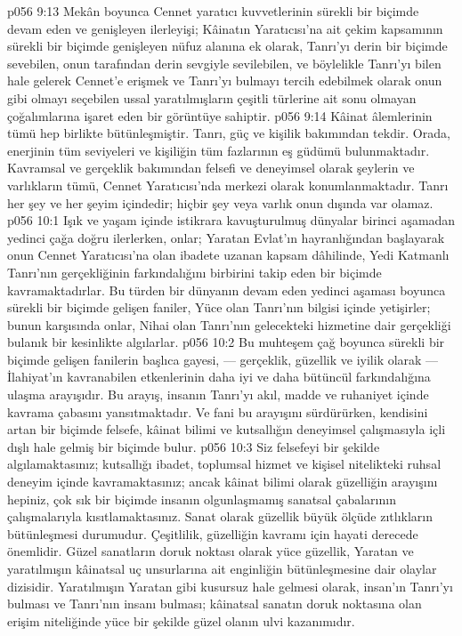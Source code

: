 \vs p056 9:13 Mekân boyunca Cennet yaratıcı kuvvetlerinin sürekli bir biçimde devam eden ve genişleyen ilerleyişi; Kâinatın Yaratıcısı’na ait çekim kapsamının sürekli bir biçimde genişleyen nüfuz alanına ek olarak, Tanrı’yı derin bir biçimde sevebilen, onun tarafından derin sevgiyle sevilebilen, ve böylelikle Tanrı’yı bilen hale gelerek Cennet’e erişmek ve Tanrı’yı bulmayı tercih edebilmek olarak onun gibi olmayı seçebilen ussal yaratılmışların çeşitli türlerine ait sonu olmayan çoğalımlarına işaret eden bir görüntüye sahiptir.
\vs p056 9:14 Kâinat âlemlerinin tümü hep birlikte bütünleşmiştir. Tanrı, güç ve kişilik bakımından tekdir. Orada, enerjinin tüm seviyeleri ve kişiliğin tüm fazlarının eş güdümü bulunmaktadır. Kavramsal ve gerçeklik bakımından felsefi ve deneyimsel olarak şeylerin ve varlıkların tümü, Cennet Yaratıcısı’nda merkezi olarak konumlanmaktadır. Tanrı her şey ve her şeyim içindedir; hiçbir şey veya varlık onun dışında var olamaz.
\vs p056 10:1 Işık ve yaşam içinde istikrara kavuşturulmuş dünyalar birinci aşamadan yedinci çağa doğru ilerlerken, onlar; Yaratan Evlat’ın hayranlığından başlayarak onun Cennet Yaratıcısı’na olan ibadete uzanan kapsam dâhilinde, Yedi Katmanlı Tanrı’nın gerçekliğinin farkındalığını birbirini takip eden bir biçimde kavramaktadırlar. Bu türden bir dünyanın devam eden yedinci aşaması boyunca sürekli bir biçimde gelişen faniler, Yüce olan Tanrı’nın bilgisi içinde yetişirler; bunun karşısında onlar, Nihai olan Tanrı’nın gelecekteki hizmetine dair gerçekliği bulanık bir kesinlikte algılarlar.
\vs p056 10:2 Bu muhteşem çağ boyunca sürekli bir biçimde gelişen fanilerin başlıca gayesi, --- gerçeklik, güzellik ve iyilik olarak --- İlahiyat’ın kavranabilen etkenlerinin daha iyi ve daha bütüncül farkındalığına ulaşma arayışıdır. Bu arayış, insanın Tanrı’yı akıl, madde ve ruhaniyet içinde kavrama çabasını yansıtmaktadır. Ve fani bu arayışını sürdürürken, kendisini artan bir biçimde felsefe, kâinat bilimi ve kutsallığın deneyimsel çalışmasıyla içli dışlı hale gelmiş bir biçimde bulur.
\vs p056 10:3 Siz felsefeyi bir şekilde algılamaktasınız; kutsallığı ibadet, toplumsal hizmet ve kişisel nitelikteki ruhsal deneyim içinde kavramaktasınız; ancak kâinat bilimi olarak güzelliğin arayışını hepiniz, çok sık bir biçimde insanın olgunlaşmamış sanatsal çabalarının çalışmalarıyla kısıtlamaktasınız. Sanat olarak güzellik büyük ölçüde zıtlıkların bütünleşmesi durumudur. Çeşitlilik, güzelliğin kavramı için hayati derecede önemlidir. Güzel sanatların doruk noktası olarak yüce güzellik, Yaratan ve yaratılmışın kâinatsal uç unsurlarına ait enginliğin bütünleşmesine dair olaylar dizisidir. Yaratılmışın Yaratan gibi kusursuz hale gelmesi olarak, insan’ın Tanrı’yı bulması ve Tanrı’nın insanı bulması; kâinatsal sanatın doruk noktasına olan erişim niteliğinde yüce bir şekilde güzel olanın ulvi kazanımıdır.
